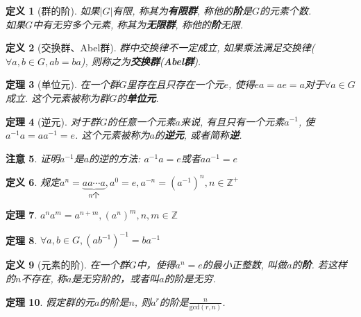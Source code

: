 \documentclass[UTF8]{ctexart}
\newtheorem{Definition}{定义}%
\newtheorem{Theorem}[Definition]{定理}
\newtheorem{Remark}[Definition]{注意}
\begin{document}
\begin{Definition}[群的阶]
如果$|G|$有限, 称其为\textbf{有限群}, 称他的\textbf{阶}是$G$的元素个数. \\
如果$G$中有无穷多个元素, 称其为\textbf{无限群}, 称他的\textbf{阶}无限.
\end{Definition}

\begin{Definition}[交换群、Abel群]
群中交换律不一定成立, 如果乘法满足交换律($\forall a, b \in G, ab = ba$), 则称之为\textbf{交换群}(\textbf{Abel群}).
\end{Definition}

\begin{Theorem}[单位元]
在一个群$G$里存在且只存在一个元$e$, 使得$ea = ae = a$对于$\forall a \in G$成立. 这个元素被称为群$G$的\textbf{单位元}.
\end{Theorem}

\begin{Theorem}[逆元]
对于群$G$的任意一个元素$a$来说, 有且只有一个元素$a^{-1}$, 
使 $a^{-1} a = a a^{-1} = e$. 这个元素被称为$a$的\textbf{逆元}, 或者简称\textbf{逆}.
\end{Theorem}

\begin{Remark}
证明$a^{-1}$是$a$的逆的方法: $a^{-1}a = e$或者$aa^{-1} = e$
\end{Remark}

\begin{Definition}
规定$a^n = \underbrace{a a \cdots a}_{n\text{个}}, a^0 = e, a^{-n} = (a^{-1})^n, n \in \mathbb{Z}^{+}$
\end{Definition}

\begin{Theorem}
$ a^n a^m = a^{n+m}, (a^n)^m, n, m \in \mathbb{Z} $
\end{Theorem}

\begin{Theorem}
$\forall a, b \in G, {(ab^{-1})}^{-1} = b a^{-1}$
\end{Theorem}

\begin{Definition}[元素的阶]
在一个群$G$中，使得$a^n = e$的最小正整数, 叫做$a$的\textbf{阶}. 若这样的$n$不存在, 称$a$是无穷阶的，或者叫$a$的阶是无穷.
\end{Definition}

\begin{Theorem}
假定群的元$a$的阶是$n$, 则$a^r$的阶是$\displaystyle \frac{n}{\text{gcd}(r, n)}$.
\end{Theorem}
\end{document}
